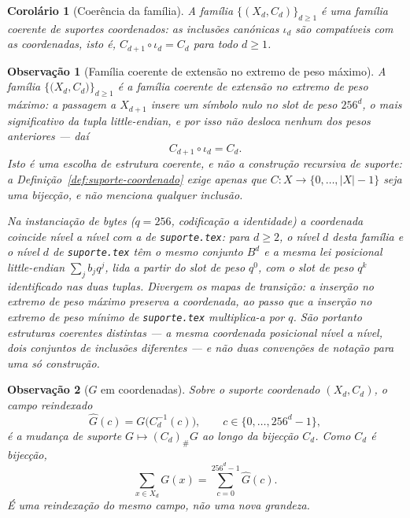 \documentclass[11pt,a4paper]{article}
\newtheorem{observacao}{Observação}
\newtheorem{corolario}{Corolário}
\begin{document}
\begin{corolario}[Coerência da família]
\label{cor:Cd-iota}
A família \(\{(X_d,C_d)\}_{d\ge1}\) é uma família coerente de suportes coordenados: as inclusões canónicas \(\iota_d\) são compatíveis com as coordenadas, isto é, \(C_{d+1}\circ\iota_d=C_d\) para todo \(d\ge1\).
\end{corolario}

\begin{observacao}[Família coerente de extensão no extremo de peso máximo]
\label{obs:extensao-pesomax}
A família \(\bigl\{\bigl(X_d,C_d\bigr)\bigr\}_{d\ge1}\) é a
\emph{família coerente de extensão no extremo de peso máximo}: a passagem a
\(X_{d+1}\) insere um símbolo nulo no slot de peso \(256^d\), o mais significativo
da tupla little-endian, e por isso não desloca nenhum dos pesos anteriores ---
daí
\[
C_{d+1}\circ\iota_d=C_d.
\]
Isto é uma escolha de estrutura coerente, e não \emph{a} construção recursiva
de suporte: a Definição~\ref{def:suporte-coordenado} exige apenas que
\(C\colon X\to\{0,\dots,\lvert X\rvert-1\}\) seja uma bijecção, e não menciona
qualquer inclusão.

Na instanciação de bytes (\(q=256\), codificação a identidade) a coordenada
coincide nível a nível com a de \texttt{suporte.tex}: para \(d\ge2\), o nível
\(d\) desta família e o nível \(d\) de \texttt{suporte.tex} têm o mesmo conjunto
\(B^d\) e a mesma lei posicional little-endian \(\sum_j b_j q^j\), lida a partir do
slot de peso \(q^0\), com o slot de peso \(q^{k}\) identificado nas duas tuplas.
Divergem os mapas de transição: a inserção no extremo de peso máximo preserva a
coordenada, ao passo que a inserção no extremo de peso mínimo de
\texttt{suporte.tex} multiplica-a por \(q\). São portanto estruturas coerentes
distintas --- a mesma coordenada posicional nível a nível, dois conjuntos de
inclusões diferentes --- e não duas convenções de notação para uma só
construção.
\end{observacao}

\begin{observacao}[\(G\) em coordenadas]
\label{obs:G-coordenado}
Sobre o suporte coordenado \((X_d,C_d)\), o campo reindexado
\[
\widehat G(c)=G\bigl(C_d^{-1}(c)\bigr),\qquad c\in\{0,\dots,256^d-1\},
\]
é a mudança de suporte \(G\mapsto(C_d)_{\#}G\) ao longo da bijecção \(C_d\). Como \(C_d\) é bijecção,
\[
\sum_{x\in X_d}G(x)=\sum_{c=0}^{256^d-1}\widehat G(c).
\]
É uma reindexação do mesmo campo, não uma nova grandeza.
\end{observacao}
\end{document}
